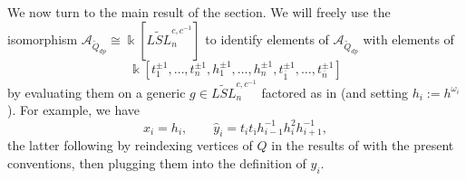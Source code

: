 \documentclass[12pt]{amsart}
\newcommand{\cA}{\mathcal{A}}
\newcommand{\kk}{\Bbbk}
\newcommand{\ol}[1]{\overline{#1}}
\newcommand{\Qdp}{\widetilde{Q}_{dp}}
\theoremstyle{remark}
\numberwithin{equation}{section}
\numberwithin{figure}{section}
\begin{document}
We now turn to the main result of the section.
We will freely use the isomorphism $\cA_{\Qdp} \cong \kk[\widetilde{LSL}_n^{c,c^{-1}}]$ to identify elements of $\cA_{\Qdp}$ with elements of 
\[
  \kk[t_{1}^{\pm1},\dotsc,t_{n}^{\pm 1},h_1^{\pm 1},\dotsc,h_{n}^{\pm 1},t_{\ol{1}}^{\pm 1},\dotsc,t_{\ol{n}}^{\pm 1}]
\]
by evaluating them on a generic $g \in \widetilde{LSL}_n^{c,c^{-1}}$ factored as in  (and setting $h_i := h^{\omega_i}$).
For example, we have 
\begin{equation}
  \label{eq:typeAyhat}
  x_i = h_i,\quad\quad \hat{y}_i = t_it_{\ol{\imath}}h_{i-1}^{-1}h_i^2h_{i+1}^{-1},
\end{equation}
the latter following by reindexing vertices of $Q$ in the results of  with the present conventions, then plugging them into the definition of $\hat{y}_i$.
\end{document}
